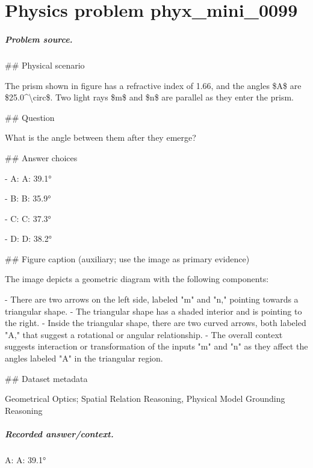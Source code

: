 
\chapter{Physics problem phyx\_mini\_0099}
\label{ch:PhyXMiniProblems_problem_phyx_mini_0099}

\paragraph{Problem source.}
\#\# Physical scenario

The prism shown in figure has a refractive index of 1.66, and the angles \$A\$ are \$25.0\textasciicircum{}\textbackslash{}circ\$. Two light rays \$m\$ and \$n\$ are parallel as they enter the prism.

\#\# Question

What is the angle between them after they emerge?

\#\# Answer choices

- A: A: 39.1°

- B: B: 35.9°

- C: C: 37.3°

- D: D: 38.2°

\#\# Figure caption (auxiliary; use the image as primary evidence)

The image depicts a geometric diagram with the following components:

- There are two arrows on the left side, labeled "m" and "n," pointing towards a triangular shape.
- The triangular shape has a shaded interior and is pointing to the right.
- Inside the triangular shape, there are two curved arrows, both labeled "A," that suggest a rotational or angular relationship.
- The overall context suggests interaction or transformation of the inputs "m" and "n" as they affect the angles labeled "A" in the triangular region.

\#\# Dataset metadata

Geometrical Optics; Spatial Relation Reasoning, Physical Model Grounding Reasoning

\paragraph{Recorded answer/context.}
A: A: 39.1°

